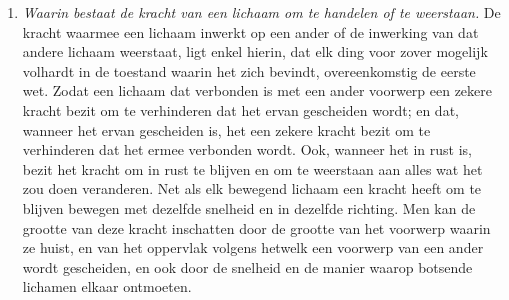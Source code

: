 \documentclass{ximera}
\begin{document}
{\begin{enumerate}
	\item[]\textit{Waarin bestaat de kracht van een lichaam om te handelen of te weerstaan.} De kracht waarmee een lichaam inwerkt op een ander of de inwerking van dat andere lichaam weerstaat, ligt enkel hierin, dat elk ding voor zover mogelijk volhardt in de toestand waarin het zich bevindt, overeenkomstig de eerste wet. Zodat een lichaam dat verbonden is met een ander voorwerp een zekere kracht bezit om te verhinderen dat het ervan gescheiden wordt; en dat, wanneer het ervan gescheiden is, het een zekere kracht bezit om te verhinderen dat het ermee verbonden wordt. Ook, wanneer het in rust is, bezit het kracht om in rust te blijven en om te weerstaan aan alles wat het zou doen veranderen. Net als elk bewegend lichaam een kracht heeft om te blijven bewegen met dezelfde snelheid en in dezelfde richting. Men kan de grootte van deze kracht inschatten door de grootte van het voorwerp waarin ze huist, en van het oppervlak volgens hetwelk een voorwerp van een ander wordt gescheiden, en ook door de snelheid en de manier waarop botsende lichamen elkaar ontmoeten.
	
	\end{enumerate}
	
	}
	
\end{document}

